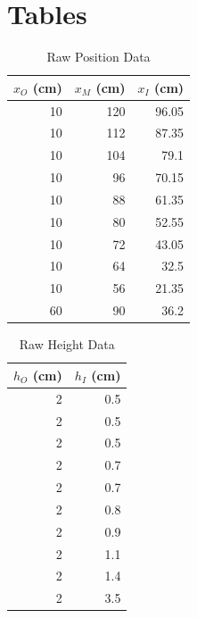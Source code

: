\section{Tables}
\begin{table}[ht]
    \centering
    \begin{tabular}{|r|r|r|}
        \hline
        $x_{O}$ (cm) & $x_{M}$ (cm) & $x_{I}$ (cm) \\
        \hline
        10 & 120 & 96.05 \\
        10 & 112 & 87.35 \\
        10 & 104 & 79.1 \\
        10 & 96 & 70.15 \\
        10 & 88 & 61.35 \\
        10 & 80 & 52.55 \\
        10 & 72 & 43.05 \\
        10 & 64 & 32.5 \\
        10 & 56 & 21.35 \\
        60 & 90 & 36.2 \\
        \hline
    \end{tabular}
    \caption{Raw Position Data}
    \label{table.07.position}
\end{table}
\begin{table}[ht]
    \centering
    \begin{tabular}{|r|r|}
        \hline
        $h_{O}$ (cm) & $h_{I}$ (cm) \\
        \hline
        2 & 0.5 \\
        2 & 0.5 \\
        2 & 0.5 \\
        2 & 0.7 \\
        2 & 0.7 \\
        2 & 0.8 \\
        2 & 0.9 \\
        2 & 1.1 \\
        2 & 1.4 \\
        2 & 3.5 \\
        \hline
    \end{tabular}
    \caption{Raw Height Data}
    \label{table.07.height}
\end{table}

